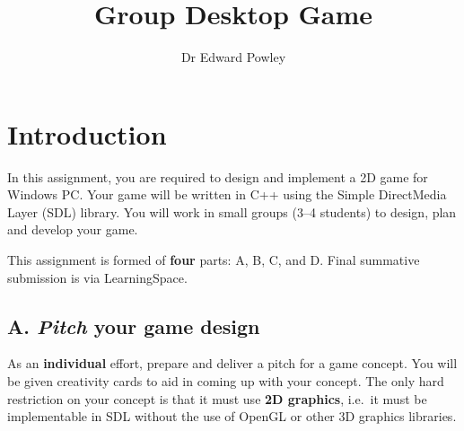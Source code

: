 \documentclass{../fal_assignment}
\title{Group Desktop Game}
\author{Dr Edward Powley}
\begin{document}
\maketitle
%    
\section*{Introduction}

In this assignment, you are required to design and implement a 2D game for Windows PC.
Your game will be written in C++ using the Simple DirectMedia Layer (SDL) library.
You will work in small groups (3--4 students) to design, plan and develop your game.


This assignment is formed of \textbf{four} parts: A, B, C, and D.
Final summative submission is via LearningSpace.

\subsection*{A. \emph{Pitch} your game design}

As an \textbf{individual} effort, prepare and deliver a pitch for a game concept.
You will be given creativity cards to aid in coming up with your concept.
The only hard restriction on your concept is that it must use \textbf{2D graphics},
i.e.\ it must be implementable in SDL without the use of OpenGL or other 3D graphics libraries.
\end{document}
